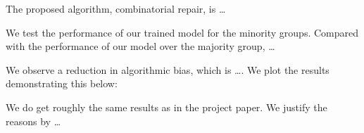\documentclass[conference]{IEEEtran}
\begin{document}
The proposed algorithm, combinatorial repair, is \dots

We test the performance of our trained model for the minority groups. Compared with the performance of our model over the majority group, \dots

We observe a reduction in algorithmic bias, which is \dots. We plot the results demonstrating this below:

We do get roughly the same results as in the project paper. We justify the reasons by \dots



\end{document}
